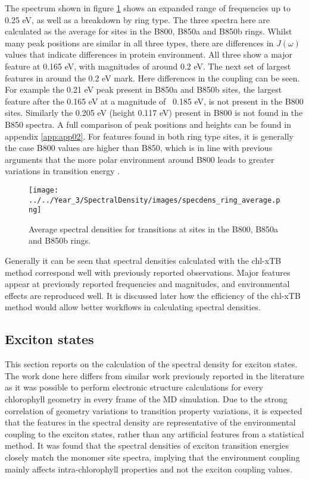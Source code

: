 The spectrum shown in figure \ref{fig:specdens_sites} shows an expanded range of
frequencies up to 0.25 eV, as well as a breakdown by ring type. The three spectra
here are calculated as the average for sites in the B800, B850a and B850b rings.
Whilst many peak positions are similar in all three types, there are differences
in $J\left(\omega\right)$ values that indicate differences in protein environment.
All three show a major feature at 0.165 eV, with magnitudes of around 0.2 eV. The 
next set of largest features in around the 0.2 eV mark. Here differences in the
coupling can be seen. For example the 0.21 eV peak present in B850a and B850b sites,
the largest feature after the 0.165 eV at a magnitude of ~0.185 eV, is not present
in the B800 sites. Similarly the 0.205 eV (height 0.117 eV) present in B800 is not
found in the B850 spectra. A full comparison of peak positions and heights can be
found in appendix \ref{app:app02}. For features found in both ring type sites, it
is generally the case B800 values are higher than B850, which is in line with previous
arguments that the more polar environment around B800 leads to greater variations 
in transition energy \cite{Olbrich2010}.

\begin{figure}
    \centering
    \texttt{[image: ../../Year\_3/SpectralDensity/images/specdens\_ring\_average.png]}
    \caption{Average spectral densities for \Qy transitions at sites in the B800,
    B850a and B850b rings.}
    \label{fig:specdens_sites}
\end{figure}

Generally it can be seen that spectral densities calculated with the chl-xTB method
correspond well with previously reported observations. Major features appear at
previously reported frequencies and magnitudes, and environmental effects are reproduced
well. It is discussed later how the efficiency of the chl-xTB method would allow
better workflows in calculating spectral densities.

\afterpartskip
\subsection{Exciton states}
\label{subsec:states}

This section reports on the calculation of the spectral density for exciton states.
The work done here differs from similar work previously reported in the literature
as it was possible to perform electronic structure calculations for every chlorophyll
geometry in every frame of the MD simulation. Due to the strong correlation of geometry
variations to \Qy transition property variations, it is expected that the features 
in the spectral density are representative of the environmental coupling to the 
exciton states, rather than any artificial features from a statistical method. It
was found that the spectral densities of exciton transition energies closely match
the monomer site spectra, implying that the environment coupling mainly affects
intra-chlorophyll properties and not the exciton coupling values.

